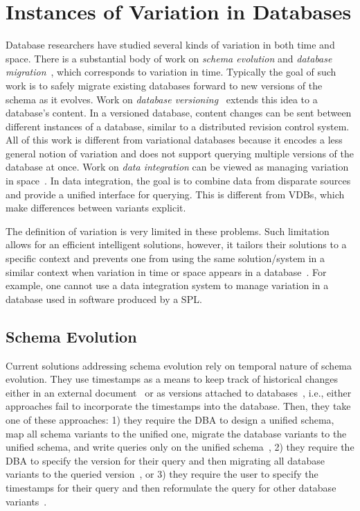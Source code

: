 \section{Instances of Variation in Databases}
\label{sec:vardbinstance}


Database researchers have studied several kinds of variation in
both time and space. There is a substantial body of work on \emph{schema
evolution} and \emph{database
migration}~\cite{Prism08Curino,prima08Moon,schEvolUnifyApp,schEvolIssues03Ram},
which corresponds to variation in time. Typically the goal of such work is to
safely migrate existing databases forward to new versions of the schema as it
evolves. 
%
Work on \emph{database versioning}~\cite{datasetVersioning,dbVersioning}
extends this idea to a database's content. In a versioned database, 
content changes can be sent between different instances of a database, similar
to a distributed revision control system.
%
All of this work is different from variational databases because it encodes a
less general notion of variation and does not support querying multiple
versions of the database at once.
%
Work on \emph{data integration} can be viewed as managing variation in
space~\cite{dataIntegBook}. In data integration, the goal is to combine data
from disparate sources and provide a unified interface for querying.
This is different from VDBs, which make differences between variants
explicit. %

 The definition of variation is very limited in these problems. Such
 limitation allows for an efficient intelligent solutions, however, it tailors
 their solutions to a specific context and prevents one from using the same
 solution/system in a similar context when variation in time or space appears
 in a database~\cite{schVersioningSurvey95Roddick}. For example, one cannot
 use a data integration system to manage variation in a database used in
 software produced by a SPL.


\subsection{Schema Evolution}
\label{sec:sch-evo}

Current solutions addressing schema evolution rely on
temporal nature of schema evolution. They use timestamps as a 
means to keep track of historical changes either in an external document~\cite{prima08Moon}
or as versions attached to 
databases~\cite{SchEvolRA90McKenzie, schVersioning97Castro, tempSchEvol91Ariav, tsql95Snodgrass}, 
i.e., either approaches fail to incorporate
the timestamps into the database. 
Then, they take one of these approaches:
1) they require the DBA to design a unified schema, map all schema variants
to the unified one, migrate the database variants to the unified schema, and
write queries only on the unified schema~\cite{schEvolUnifyApp},
2) they require the DBA to specify the version for their query and then migrating
all database variants to the queried 
version~\cite{SchEvolRA90McKenzie, schVersioning97Castro, tempSchEvol91Ariav, tsql95Snodgrass},
or 3) they require the user to specify the timestamps for their query and
then reformulate the query for other database variants~\cite{prima08Moon}.


